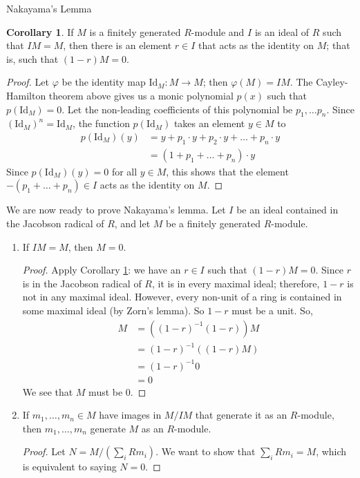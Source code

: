 \documentclass[12pt]{article}
\theoremstyle{definition}
\newtheorem{corollary}[definition]{Corollary}
\begin{document}
\begin{section}{Nakayama's Lemma}
	\begin{corollary}
		If $M$ is a finitely generated $R$-module and $I$ is an ideal of $R$ such that $IM = M$, then there is an element $r \in I$ that acts as the identity on $M$; that is, such that $(1 - r)M = 0$.	 
		\label{cor}
		\begin{proof}
			Let $\varphi$ be the identity map $\text{Id}_M: M \to M$; then $\varphi(M) = IM$. The Cayley-Hamilton theorem above gives us a monic polynomial $p(x)$ such that $p(\text{Id}_M) = 0$. Let the non-leading coefficients of this polynomial be $p_1, \dots p_n$. Since $(\text{Id}_M)^n = \text{Id}_M$, the function $p(\text{Id}_M)$ takes an element $ y \in M$ to
			\begin{align*}p(\text{Id}_M)(y) &= y + p_{1}\cdot y + p_2\cdot y + \dots + p_n \cdot y\\
			&= (1 + p_1 + \dots + p_n) \cdot y\end{align*}
			Since $p(\text{Id}_M)(y) = 0$ for all $y \in M$, this shows that the element $- (p_1 + \dots+ p_n) \in I$ acts as the identity on $M$.
		\end{proof}
	\end{corollary}
	We are now ready to prove Nakayama's lemma. Let $I$ be an ideal contained in the Jacobson radical of $R$, and let $M$ be a finitely generated $R$-module.
	\begin{enumerate}[label=\alph*.]
		\item If $IM = M$, then $M = 0$.
			\begin{proof}
				Apply Corollary \ref{cor}: we have an $r \in I$ such that $(1 - r)M = 0$. Since $r$ is in the Jacobson radical of $R$, it is in every maximal ideal; therefore, $1-r$ is not in any maximal ideal. However, every non-unit of a ring is contained in some maximal ideal (by Zorn's lemma). So $1-r$ must be a unit. So,
				\begin{align*}
					M &= ((1-r)^{-1}(1-r))M\\
					&= (1-r)^{-1}( (1-r)M)\\
					&= (1-r)^{-1}0\\
					&= 0
				\end{align*}
				We see that $M$ must be $0$.
			\end{proof}
		\item If $m_1, \dots, m_n \in M$ have images in $M/IM$ that generate it as an $R$-module, then $m_1, \dots, m_n$ generate $M$ as an $R$-module.
			\begin{proof}
				Let $N = M/ (\sum_i Rm_i)$. We want to show that $\sum_i Rm_i = M$, which is equivalent to saying $N = 0$. 
			\end{proof}
	\end{enumerate}
\end{section}
\end{document}
